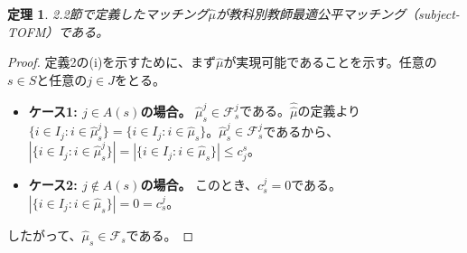 \documentclass[12pt, a4paper]{article}
\theoremstyle{definition}
\theoremstyle{remark}
\theoremstyle{plain}
\newtheorem{theorem}{定理}
\begin{document}
\begin{theorem}
2.2節で定義したマッチング$\hat{\mu}$が教科別教師最適公平マッチング（subject-TOFM）である。
\end{theorem}


\begin{proof}


定義2の(i)を示すために、まず$\hat{\mu}$が実現可能であることを示す。任意の$s \in S$と任意の$j \in J$をとる。
\begin{itemize}
    \item \textbf{ケース1: $j \in A(s)$の場合。} $\hat{\mu}^j_s \in \mathcal{F}^j_s$である。$\hat{\hat{\mu}}$の定義より$\{i \in I_j : i \in \hat{\mu}^j_s\} = \{ i \in I_j : i\in \hat{\mu}_s \}$。$\hat{\mu}^j_s \in \mathcal{F}^j_s$であるから、$|\{i \in I_j : i \in \hat{\mu}^j_s\}| = |\{ i \in I_j : i\in \hat{\mu}_s \}| \leq c_j^s$。
    \item \textbf{ケース2: $j \notin A(s)$の場合。} このとき、$c^j_s=0$である。$|\{i \in I_j : i \in \hat{\mu}_s\}|= 0 = c^j_s$。
\end{itemize}
したがって、$\hat{\mu}_s \in \mathcal{F}_s$である。


\end{proof}
\end{document}
